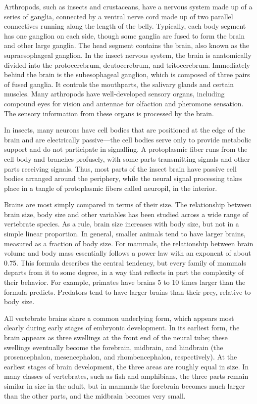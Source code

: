 Arthropods, such as insects and crustaceans, have a nervous system made up of a series of ganglia, connected by a ventral nerve cord made up of two parallel connectives running along the length of the belly. Typically, each body segment has one ganglion on each side, though some ganglia are fused to form the brain and other large ganglia. The head segment contains the brain, also known as the supraesophageal ganglion. In the insect nervous system, the brain is anatomically divided into the protocerebrum, deutocerebrum, and tritocerebrum. Immediately behind the brain is the subesophageal ganglion, which is composed of three pairs of fused ganglia. It controls the mouthparts, the salivary glands and certain muscles. Many arthropods have well-developed sensory organs, including compound eyes for vision and antennae for olfaction and pheromone sensation. The sensory information from these organs is processed by the brain.

In insects, many neurons have cell bodies that are positioned at the edge of the brain and are electrically passive---the cell bodies serve only to provide metabolic support and do not participate in signalling. A protoplasmic fiber runs from the cell body and branches profusely, with some parts transmitting signals and other parts receiving signals. Thus, most parts of the insect brain have passive cell bodies arranged around the periphery, while the neural signal processing takes place in a tangle of protoplasmic fibers called neuropil, in the interior.

Brains are most simply compared in terms of their size. The relationship between brain size, body size and other variables has been studied across a wide range of vertebrate species. As a rule, brain size increases with body size, but not in a simple linear proportion. In general, smaller animals tend to have larger brains, measured as a fraction of body size. For mammals, the relationship between brain volume and body mass essentially follows a power law with an exponent of about 0.75. This formula describes the central tendency, but every family of mammals departs from it to some degree, in a way that reflects in part the complexity of their behavior. For example, primates have brains 5 to 10 times larger than the formula predicts. Predators tend to have larger brains than their prey, relative to body size.

All vertebrate brains share a common underlying form, which appears most clearly during early stages of embryonic development. In its earliest form, the brain appears as three swellings at the front end of the neural tube; these swellings eventually become the forebrain, midbrain, and hindbrain (the prosencephalon, mesencephalon, and rhombencephalon, respectively). At the earliest stages of brain development, the three areas are roughly equal in size. In many classes of vertebrates, such as fish and amphibians, the three parts remain similar in size in the adult, but in mammals the forebrain becomes much larger than the other parts, and the midbrain becomes very small.



